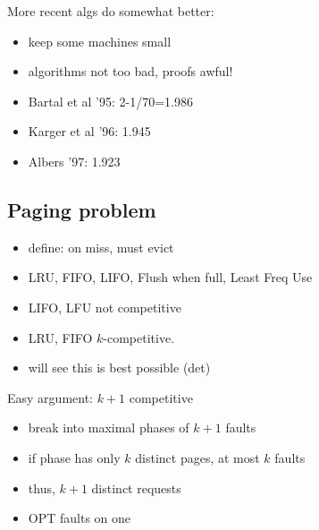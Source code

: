 \documentclass{article}
\begin{document}
More recent algs do somewhat better:
\begin{itemize}
\item keep some machines small
\item algorithms not too bad, proofs awful!
\item Bartal et al '95: 2-1/70=1.986
\item Karger et al '96: 1.945
\item Albers '97: 1.923
\end{itemize}


\subsection{Paging problem}

\begin{itemize}
\item define: on miss, must evict
\item LRU, FIFO, LIFO, Flush when full, Least Freq Use
\item LIFO, LFU not competitive
\item LRU, FIFO $k$-competitive.
\item will see this is best possible (det)
\end{itemize}

Easy argument: $k+1$ competitive
\begin{itemize}
\item break into maximal phases of $k+1$ faults
\item if phase has only $k$ distinct pages, at most $k$ faults
\item thus, $k+1$ distinct requests
\item OPT faults on one
\end{itemize}
\end{document}
